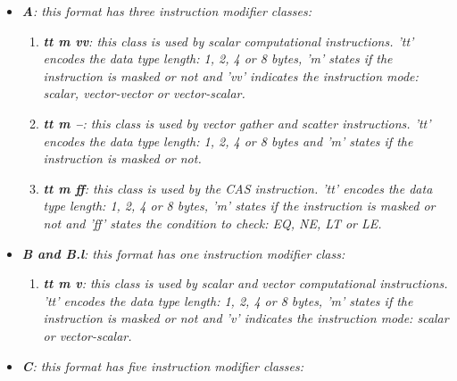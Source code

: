             \begin{itemize}

                \item \textit{\textbf{A}: this format has three instruction modifier classes:}

                    \begin{enumerate}

                        \item \textit{\textbf{tt m vv}: this class is used by scalar computational instructions. 'tt' encodes the data type length: 1, 2, 4 or 8 bytes, 'm' states if the instruction is masked or not and 'vv' indicates the instruction mode: scalar, vector-vector or vector-scalar.}

                        \item \textit{\textbf{tt m --}: this class is used by vector gather and scatter instructions. 'tt' encodes the data type length: 1, 2, 4 or 8 bytes and 'm' states if the instruction is masked or not.}

                        \item \textit{\textbf{tt m ff}: this class is used by the CAS instruction. 'tt' encodes the data type length: 1, 2, 4 or 8 bytes, 'm' states if the instruction is masked or not and 'ff' states the condition to check: EQ, NE, LT or LE.}

                    \end{enumerate}

                \item \textit{\textbf{B and B.l}: this format has one instruction modifier class:}

                    \begin{enumerate}

                        \item \textit{\textbf{tt m v}: this class is used by scalar and vector computational instructions. 'tt' encodes the data type length: 1, 2, 4 or 8 bytes, 'm' states if the instruction is masked or not and 'v' indicates the instruction mode: scalar or vector-scalar.}

                    \end{enumerate}

                \item \textit{\textbf{C}: this format has five instruction modifier classes:}

                    \begin{enumerate}


\end{enumerate}
\end{itemize}
